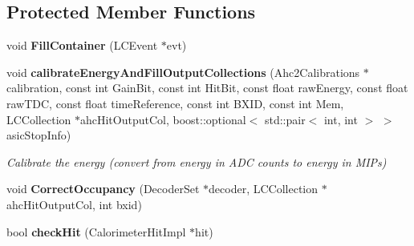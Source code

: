 \subsection*{Protected Member Functions}
\begin{DoxyCompactItemize}
\item 
void {\bfseries Fill\-Container} (L\-C\-Event $\ast$evt)\label{classCALICE_1_1Ahc2CalibrateProcessor_acaa509d1340c3afffb7f3eea852397f5}

\item 
void {\bf calibrate\-Energy\-And\-Fill\-Output\-Collections} (Ahc2\-Calibrations $\ast$calibration, const int Gain\-Bit, const int Hit\-Bit, const float raw\-Energy, const float raw\-T\-D\-C, const float time\-Reference, const int B\-X\-I\-D, const int Mem, L\-C\-Collection $\ast$ahc\-Hit\-Output\-Col, boost\-::optional$<$ std\-::pair$<$ int, int $>$ $>$ asic\-Stop\-Info)
\begin{DoxyCompactList}\small\item\em Calibrate the energy (convert from energy in A\-D\-C counts to energy in M\-I\-Ps) \end{DoxyCompactList}\item 
void {\bfseries Correct\-Occupancy} (Decoder\-Set $\ast$decoder, L\-C\-Collection $\ast$ahc\-Hit\-Output\-Col, int bxid)\label{classCALICE_1_1Ahc2CalibrateProcessor_a710d5725af93224c9e277df6994535ab}

\item 
bool {\bfseries check\-Hit} (Calorimeter\-Hit\-Impl $\ast$hit)\label{classCALICE_1_1Ahc2CalibrateProcessor_aaa5a4d84225a0455058ec8ab24f650b1}

\end{DoxyCompactItemize}
